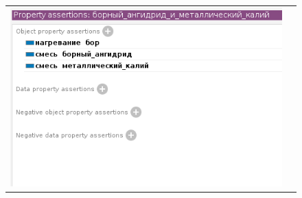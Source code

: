 \documentclass[a4paper]{article}
\begin{document}
\begin{landscape}
\begin{figure}
\begin{tabular}{cc}
  \includegraphics[scale=1.0]{./Source/protege/compos.png}
  \end{tabular} 
  \end{figure} 
  \end{landscape} 
\end{document}
